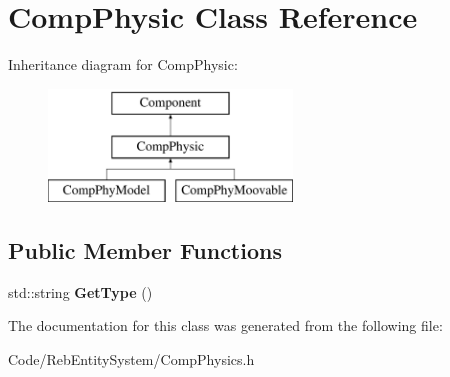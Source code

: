 \hypertarget{class_comp_physic}{}\section{Comp\+Physic Class Reference}
\label{class_comp_physic}
Inheritance diagram for Comp\+Physic\+:\begin{figure}[H]
\begin{center}
\leavevmode
\includegraphics[height=3.000000cm]{class_comp_physic}
\end{center}
\end{figure}
\subsection*{Public Member Functions}
\begin{DoxyCompactItemize}
\item 
std\+::string {\bfseries Get\+Type} ()\hypertarget{class_comp_physic_a56af12ce4e88c8e4edc0e7f07bd7d1a0}{}\label{class_comp_physic_a56af12ce4e88c8e4edc0e7f07bd7d1a0}

\end{DoxyCompactItemize}


The documentation for this class was generated from the following file\+:\begin{DoxyCompactItemize}
\item 
Code/\+Reb\+Entity\+System/Comp\+Physics.\+h\end{DoxyCompactItemize}
